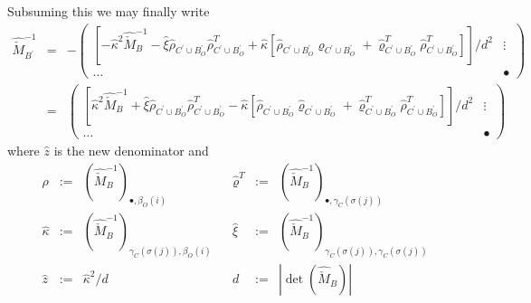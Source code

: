 \documentclass[a4paper]{article}
\begin{document}
Subsuming this we may finally write
\begin{eqnarray}
\label{def:update_Z2}
\hat{\check{M}}_{B^{\prime}}^{-1}
&=&
-
\left(
\begin{array}{c|c}
\left[
  -\hat{\kappa}^{2}\hat{\check{M}}_{B}^{-1}
  -\hat{\xi}
  \hat{\rho}_{C^{\prime} \cup B_{O}^{\prime}}
  \hat{\rho}_{C^{\prime} \cup B_{O}^{\prime}}^{T}
  +\hat{\kappa}
  \left[
    \hat{\rho}_{C^{\prime} \cup B_{O}^{\prime}}
    \hat{\varrho}_{C^{\prime} \cup B_{O}^{\prime}}
    +\hat{\varrho}_{C^{\prime} \cup B_{O}^{\prime}}^{T}
    \hat{\rho}_{C^{\prime} \cup B_{O}^{\prime}}^{T}
  \right]
\right]/d^{2}
&
\vdots
\\
\hline
\hdots
&
\bullet
\end{array}
\right)
\nonumber \\
&=&
\left(
\begin{array}{c|c}
\left[
  \hat{\kappa}^{2}\hat{\check{M}}_{B}^{-1}
  +\hat{\xi}
  \hat{\rho}_{C^{\prime} \cup B_{O}^{\prime}}
  \hat{\rho}_{C^{\prime} \cup B_{O}^{\prime}}^{T}
  -\hat{\kappa}
  \left[
    \hat{\rho}_{C^{\prime} \cup B_{O}^{\prime}}
    \hat{\varrho}_{C^{\prime} \cup B_{O}^{\prime}}
    +\hat{\varrho}_{C^{\prime} \cup B_{O}^{\prime}}^{T}
    \hat{\rho}_{C^{\prime} \cup B_{O}^{\prime}}^{T}
  \right]
\right]/d^{2}
&
\vdots
\\
\hline
\hdots
&
\bullet
\end{array}
\right)
\end{eqnarray}
where $\hat{z}$ is the new denominator and 
\begin{equation}
\label{def:update_Z2_entities}
\begin{array}{rclcrcl}
\hat{\rho}
&:=&
\left(
  \hat{\check{M}}_{B}^{-1}
\right)_{\bullet, \beta_{O}(i)}
&&
\hat{\varrho}^{T}
&:=&
\left(
  \hat{\check{M}}_{B}^{-1}
\right)_{\bullet, \gamma_{C}(\sigma(j))}
\\
\hat{\kappa}
&:=&
\left(
  \hat{\check{M}}_{B}^{-1}
\right)_{\gamma_{C}(\sigma(j)), \beta_{O}(i)}
&&
\hat{\xi}
&:=&
\left(
  \hat{\check{M}}_{B}^{-1}
\right)_{\gamma_{C}(\sigma(j)), \gamma_{C}(\sigma(j))}
\\
\hat{z}
&:=&
\hat{\kappa}^{2}/d
&&
d
&:=&
\left|\det(\hat{\check{M}}_{B})\right|
\end{array}
\end{equation}
\end{document}
